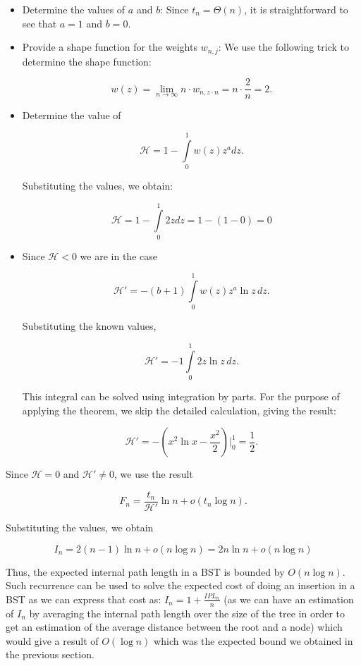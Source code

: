 \begin{itemize}
    \item Determine the values of \( a \) and \( b \): Since \( t_n = \Theta(n) \), it is straightforward to see that $a = 1$ and $b = 0$.
    \item Provide a shape function for the weights \( w_{n,j} \): We use the following trick to determine the shape function:

    \[
    w(z) = \lim\limits_{n\to\infty} n \cdot w_{n,z\cdot n} = n \cdot \frac{2}{n} = 2.
    \]

    \item Determine the value of 

    \[
    \mathcal{H} = 1 - \int\limits_{0}^{1} w(z) z^a dz.
    \]

    Substituting the values, we obtain:

    \[
    \mathcal{H} = 1 - \int\limits_{0}^{1} 2z dz = 1 - (1 - 0) = 0
    \]

    \item Since \( \mathcal{H} < 0 \) we are in the case

    \[
    \mathcal{H'} = -(b+1) \int\limits_{0}^{1} w(z) z^a \ln z \, dz.
    \]

    Substituting the known values,

    \[
    \mathcal{H'} = -1 \int\limits_{0}^{1} 2z \ln z \, dz.
    \]

    This integral can be solved using integration by parts. For the purpose of applying the theorem, we skip the detailed calculation, giving the result:

    \[
    \mathcal{H'} = - (x^2 \ln x - \frac{x^2}{2})\Big|_0^1 = \frac{1}{2}.
    \]

\end{itemize}

Since \( \mathcal{H} = 0 \) and \( \mathcal{H'} \neq 0 \), we use the result

\[
F_n = \frac{t_n}{\mathcal{H'}} \ln n + o(t_n \log n).
\]

Substituting the values, we obtain

\[
I_n = 2(n-1) \ln n + o(n \log n) = 2n \ln n + o(n \log n)
\]

Thus, the expected internal path length in a BST is bounded by \( O(n \log n) \). Such recurrence can be used to solve the expected cost of doing an insertion in a BST as we can express that cost as: $I_n = 1 + \frac{IPL_n}{n}$ (as we can have an estimation of $I_n$ by averaging the internal path length over the size of the tree in order to get an estimation of the average distance between the root and a node) which would give a result of $O(\log n)$ which was the expected bound we obtained in the previous section.

